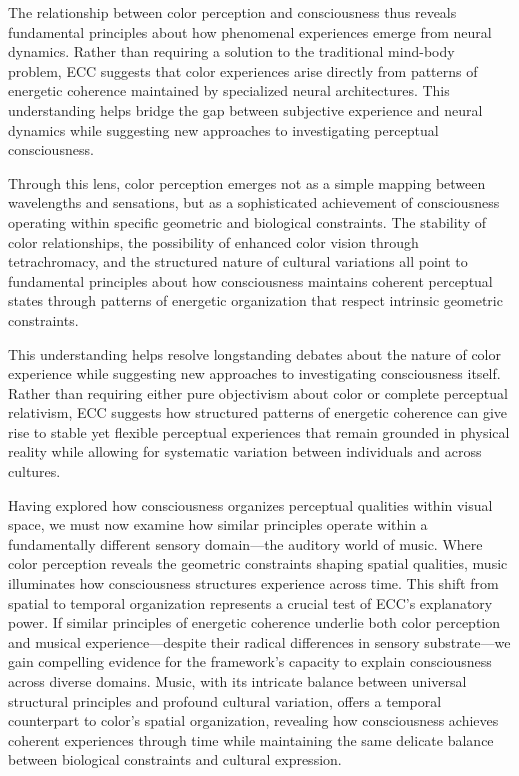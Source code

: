 The relationship between color perception and consciousness thus reveals fundamental principles about how phenomenal experiences emerge from neural dynamics. Rather than requiring a solution to the traditional mind-body problem, ECC suggests that color experiences arise directly from patterns of energetic coherence maintained by specialized neural architectures. This understanding helps bridge the gap between subjective experience and neural dynamics while suggesting new approaches to investigating perceptual consciousness.

Through this lens, color perception emerges not as a simple mapping between wavelengths and sensations, but as a sophisticated achievement of consciousness operating within specific geometric and biological constraints. The stability of color relationships, the possibility of enhanced color vision through tetrachromacy, and the structured nature of cultural variations all point to fundamental principles about how consciousness maintains coherent perceptual states through patterns of energetic organization that respect intrinsic geometric constraints.

This understanding helps resolve longstanding debates about the nature of color experience while suggesting new approaches to investigating consciousness itself. Rather than requiring either pure objectivism about color or complete perceptual relativism, ECC suggests how structured patterns of energetic coherence can give rise to stable yet flexible perceptual experiences that remain grounded in physical reality while allowing for systematic variation between individuals and across cultures.

Having explored how consciousness organizes perceptual qualities within visual space, we must now examine how similar principles operate within a fundamentally different sensory domain—the auditory world of music. Where color perception reveals the geometric constraints shaping spatial qualities, music illuminates how consciousness structures experience across time. This shift from spatial to temporal organization represents a crucial test of ECC's explanatory power. If similar principles of energetic coherence underlie both color perception and musical experience—despite their radical differences in sensory substrate—we gain compelling evidence for the framework's capacity to explain consciousness across diverse domains. Music, with its intricate balance between universal structural principles and profound cultural variation, offers a temporal counterpart to color's spatial organization, revealing how consciousness achieves coherent experiences through time while maintaining the same delicate balance between biological constraints and cultural expression.
